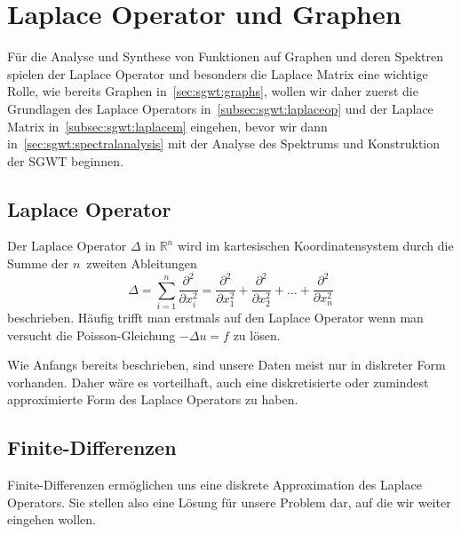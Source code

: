 
\section{Laplace Operator und Graphen\label{sec:sgwt:laplace}}

F\"ur die Analyse und Synthese von Funktionen auf Graphen und deren Spektren 
spielen der 
Laplace Operator und besonders die Laplace Matrix eine wichtige Rolle, wie 
bereits Graphen in~\cref{sec:sgwt:graphs}, wollen wir daher zuerst 
die Grundlagen des Laplace Operators in~\cref{subsec:sgwt:laplaceop} und der 
Laplace Matrix \laplaceL{} in~\cref{subsec:sgwt:laplacem} eingehen, bevor wir 
dann in~\cref{sec:sgwt:spectralanalysis} mit der Analyse des Spektrums und 
Konstruktion der SGWT beginnen.

\subsection{Laplace Operator\label{subsec:sgwt:laplaceop}}

Der Laplace Operator $\Delta$ in $\mathbb{R}^n$ wird im kartesischen 
Koordinatensystem durch die Summe der $n$~zweiten Ableitungen
\begin{equation*}
\Delta = 
\sum_{i = 1}^{n}\frac{\partial^2}{\partial x_i^2}
=
\frac{\partial^2}{\partial x_1^2}
+ \frac{\partial^2}{\partial x_2^2}
+ \dots
+ \frac{\partial^2}{\partial x_n^2}
\end{equation*}
beschrieben. H\"aufig trifft man erstmals auf den Laplace Operator wenn man 
versucht die Poisson-Gleichung $-\Delta u = f$ zu l\"osen.

Wie Anfangs bereits beschrieben, sind unsere Daten meist nur in diskreter Form 
vorhanden. Daher w\"are es vorteilhaft, auch eine diskretisierte oder zumindest 
approximierte Form des Laplace Operators zu haben.

\subsection{Finite-Differenzen}

Finite-Differenzen erm\"oglichen uns eine diskrete Approximation des 
Laplace Operators. Sie stellen also eine L\"osung f\"ur unsere Problem dar, auf 
die wir weiter eingehen wollen.

